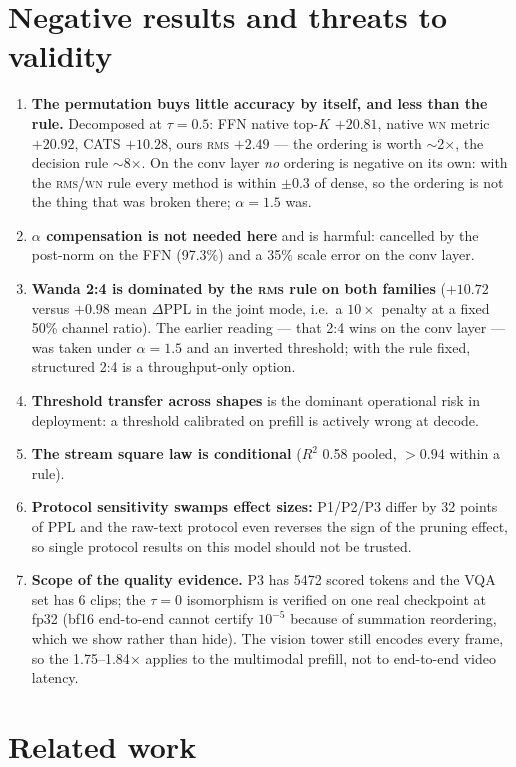 \documentclass[11pt]{article}
\newcommand{\rms}{\textsc{rms}}
\newcommand{\wn}{\textsc{wn}}
\begin{document}
\section{Negative results and threats to validity}
\begin{enumerate}
\item \textbf{The permutation buys little accuracy by itself, and less than the rule.}
Decomposed at $\tau{=}0.5$: FFN native top-$K$ $+20.81$, native \wn{} metric $+20.92$,
CATS $+10.28$, ours \rms{} $+2.49$ --- the ordering is worth $\sim$2$\times$, the decision
rule $\sim$8$\times$. On the conv layer \emph{no} ordering is negative on its own: with the
\rms/\wn{} rule every method is within $\pm0.3$ of dense, so the ordering is not the thing
that was broken there; $\alpha{=}1.5$ was.
\item \textbf{$\alpha$ compensation is not needed here} and is harmful: cancelled by the
post-norm on the FFN (97.3\%) and a 35\% scale error on the conv layer.
\item \textbf{Wanda 2:4 is dominated by the \rms{} rule on both families} ($+10.72$ versus
$+0.98$ mean $\Delta$PPL in the joint mode, i.e.\ a $10\times$ penalty at a fixed 50\%
channel ratio). The earlier reading --- that 2:4 wins on the conv layer --- was taken under
$\alpha{=}1.5$ and an inverted threshold; with the rule fixed, structured 2:4 is a
throughput-only option.
\item \textbf{Threshold transfer across shapes} is the dominant operational risk in
deployment: a threshold calibrated on prefill is actively wrong at decode.
\item \textbf{The stream square law is conditional} ($R^2$ 0.58 pooled, $>0.94$ within a
rule).
\item \textbf{Protocol sensitivity swamps effect sizes:} P1/P2/P3 differ by 32 points of
PPL and the raw-text protocol even reverses the sign of the pruning effect, so single
protocol results on this model should not be trusted.
\item \textbf{Scope of the quality evidence.} P3 has 5472 scored tokens and the VQA set has
6 clips; the $\tau{=}0$ isomorphism is verified on one real checkpoint at fp32 (bf16
end-to-end cannot certify $10^{-5}$ because of summation reordering, which we show rather
than hide). The vision tower still encodes every frame, so the 1.75--1.84$\times$ applies
to the multimodal prefill, not to end-to-end video latency.
\end{enumerate}

\section{Related work}
\end{document}
